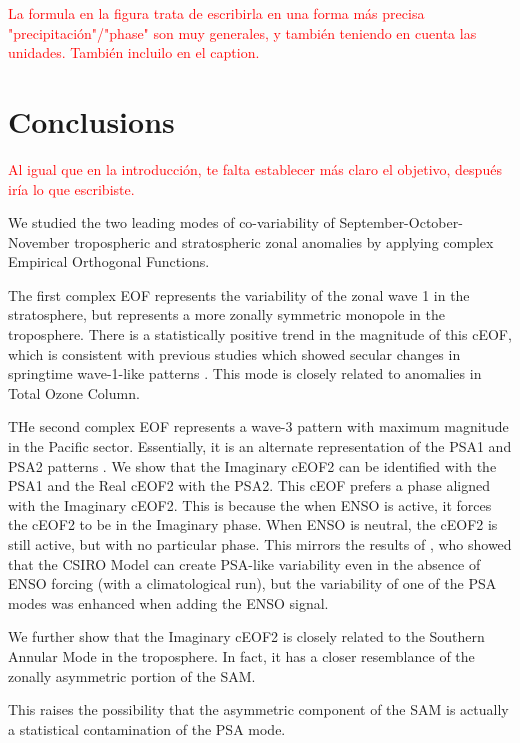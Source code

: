 \documentclass[smallextended]{svjour3}       %
\begin{document}
\textcolor{red}{La formula en la figura trata de escribirla en una forma más precisa "precipitación"/"phase" son muy generales, y también teniendo en cuenta las unidades. También incluilo en el caption.}



\hypertarget{conclusions}{%
\section{Conclusions}\label{conclusions}}

\textcolor{red}{Al igual que en la introducción, te falta establecer más claro el objetivo, después iría lo que escribiste.}

We studied the two leading modes of co-variability of September-October-November tropospheric and stratospheric zonal anomalies by applying complex Empirical Orthogonal Functions.

The first complex EOF represents the variability of the zonal wave 1 in the stratosphere, but represents a more zonally symmetric monopole in the troposphere.
There is a statistically positive trend in the magnitude of this cEOF, which is consistent with previous studies which showed secular changes in springtime wave-1-like patterns \citep[e.g.][]{raphael2003}.
This mode is closely related to anomalies in Total Ozone Column.

THe second complex EOF represents a wave-3 pattern with maximum magnitude in the Pacific sector.
Essentially, it is an alternate representation of the PSA1 and PSA2 patterns \citep{mo2001}.
We show that the Imaginary cEOF2 can be identified with the PSA1 and the Real cEOF2 with the PSA2.
This cEOF prefers a phase aligned with the Imaginary cEOF2.
This is because the when ENSO is active, it forces the cEOF2 to be in the Imaginary phase.
When ENSO is neutral, the cEOF2 is still active, but with no particular phase.
This mirrors the results of \citet{cai2002}, who showed that the CSIRO Model can create PSA-like variability even in the absence of ENSO forcing (with a climatological run), but the variability of one of the PSA modes was enhanced when adding the ENSO signal.

We further show that the Imaginary cEOF2 is closely related to the Southern Annular Mode in the troposphere.
In fact, it has a closer resemblance of the zonally asymmetric portion of the SAM.

This raises the possibility that the asymmetric component of the SAM is actually a statistical contamination of the PSA mode.
\end{document}
